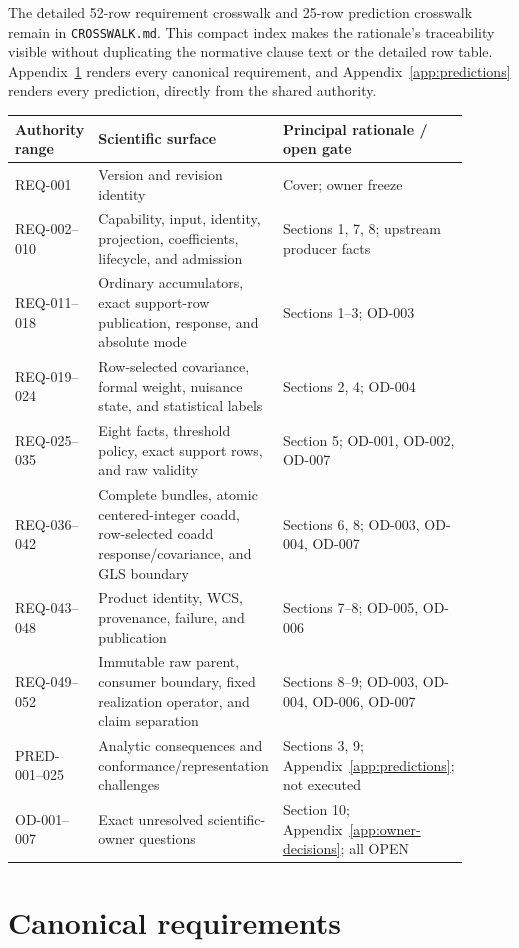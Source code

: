 \documentclass[10pt]{article}
\newcommand{\code}[1]{\nolinkurl{#1}}
\begin{document}
The detailed 52-row requirement crosswalk and 25-row prediction crosswalk
remain in \code{CROSSWALK.md}. This compact index makes the rationale's
traceability visible without duplicating the normative clause text or the
detailed row table. Appendix~\ref{app:requirements} renders every canonical
requirement, and Appendix~\ref{app:predictions} renders every prediction,
directly from the shared authority.

\begin{longtable}{L{0.19\linewidth}L{0.38\linewidth}L{0.33\linewidth}}
\toprule
Authority range & Scientific surface & Principal rationale / open gate\\
\midrule
REQ-001 & Version and revision identity & Cover; owner freeze\\
REQ-002--010 & Capability, input, identity, projection, coefficients, lifecycle,
and admission & Sections 1, 7, 8; upstream producer facts\\
REQ-011--018 & Ordinary accumulators, exact support-row publication, response,
and absolute mode & Sections 1--3; OD-003\\
REQ-019--024 & Row-selected covariance, formal weight, nuisance state, and
statistical labels & Sections 2, 4; OD-004\\
REQ-025--035 & Eight facts, threshold policy, exact support rows, and raw
validity & Section 5; OD-001, OD-002, OD-007\\
REQ-036--042 & Complete bundles, atomic centered-integer coadd, row-selected
coadd response/covariance, and GLS boundary & Sections 6, 8; OD-003, OD-004,
OD-007\\
REQ-043--048 & Product identity, WCS, provenance, failure, and publication &
Sections 7--8; OD-005, OD-006\\
REQ-049--052 & Immutable raw parent, consumer boundary, fixed realization
operator, and claim separation & Sections 8--9; OD-003, OD-004, OD-006,
OD-007\\
PRED-001--025 & Analytic consequences and conformance/representation challenges
& Sections 3, 9; Appendix~\ref{app:predictions}; not executed\\
OD-001--007 & Exact unresolved scientific-owner questions & Section 10;
Appendix~\ref{app:owner-decisions}; all OPEN\\
\bottomrule
\end{longtable}

\clearpage
\section{Canonical requirements}\label{app:requirements}
\end{document}

